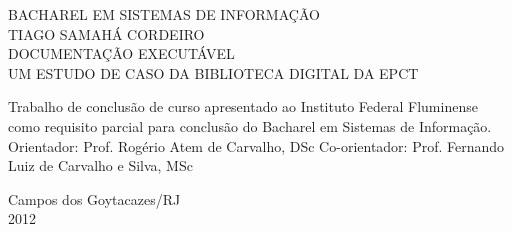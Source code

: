 \begin{titlepage}
 \begin{figure}[ht]
 \centering
 \end{figure}
 \begin{center}
   {\large BACHAREL EM SISTEMAS DE INFORMAÇÃO} \\ [3.5cm]
   {\large TIAGO SAMAHÁ CORDEIRO} \\ [3cm]
   {\large DOCUMENTAÇÃO EXECUTÁVEL}\\ [0.5cm]
   {\small UM ESTUDO DE CASO DA BIBLIOTECA DIGITAL DA EPCT} \\ [3cm]
   \hspace{.45\textwidth} %
   \begin{minipage}{0.53\textwidth}
   \begin{espacosimples}
      Trabalho de conclusão de curso apresentado ao Instituto Federal Fluminense como requisito parcial para conclusão do Bacharel em Sistemas de Informação.\\[1.5cm]
      Orientador: Prof. Rogério Atem de Carvalho, DSc
      Co-orientador: Prof. Fernando Luiz de Carvalho e Silva, MSc
    \end{espacosimples}
    \end{minipage}
   \vfill
   {\large Campos dos Goytacazes/RJ} \\
   {\large 2012}
 \end{center}
\end{titlepage}